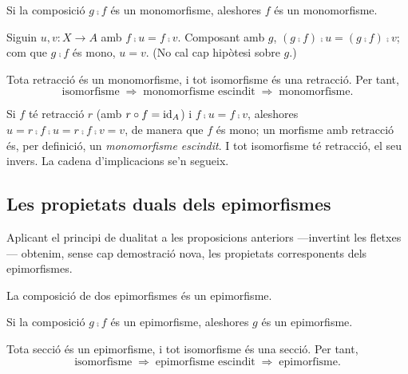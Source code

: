 \begin{proposicio}\label{prop:mono-factor}
Si la composició $g\comp f$ és un monomorfisme, aleshores $f$ és un monomorfisme.
\end{proposicio}

\begin{prova}
Siguin $u,v\colon X\to A$ amb $f\comp u=f\comp v$. Composant amb $g$, $(g\comp f)\comp u=(g\comp f)\comp v$; com que $g\comp f$ és mono, $u=v$. (No cal cap hipòtesi sobre $g$.)
\end{prova}

\begin{proposicio}\label{prop:iso-retr-mono}
Tota retracció és un monomorfisme, i tot isomorfisme és una retracció. Per tant,
\[
\text{isomorfisme} \;\Longrightarrow\; \text{monomorfisme escindit} \;\Longrightarrow\; \text{monomorfisme}.
\]
\end{proposicio}

\begin{prova}
Si $f$ té retracció $r$ (amb $r\circ f=\operatorname{id}_A$) i $f\comp u=f\comp v$, aleshores $u=r\comp f\comp u=r\comp f\comp v=v$, de manera que $f$ és mono; un morfisme amb retracció és, per definició, un \emph{monomorfisme escindit}. I tot isomorfisme té retracció, el seu invers. La cadena d'implicacions se'n segueix.
\end{prova}

\subsection{Les propietats duals dels epimorfismes}

Aplicant el principi de dualitat a les proposicions anteriors ---invertint les fletxes--- obtenim, sense cap demostració nova, les propietats corresponents dels epimorfismes.

\begin{proposicio}\label{prop:epi-comp}
La composició de dos epimorfismes és un epimorfisme.
\end{proposicio}

\begin{proposicio}\label{prop:epi-factor}
Si la composició $g\comp f$ és un epimorfisme, aleshores $g$ és un epimorfisme.
\end{proposicio}

\begin{proposicio}\label{prop:iso-sec-epi}
Tota secció és un epimorfisme, i tot isomorfisme és una secció. Per tant,
\[
\text{isomorfisme} \;\Longrightarrow\; \text{epimorfisme escindit} \;\Longrightarrow\; \text{epimorfisme}.
\]
\end{proposicio}

